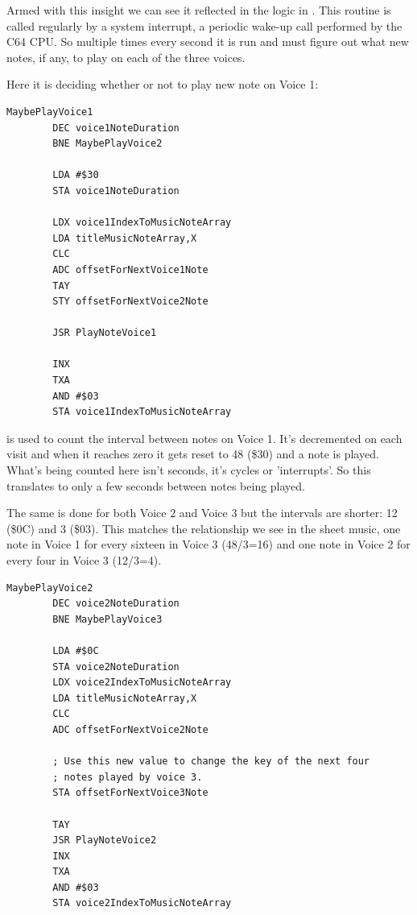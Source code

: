 Armed with this insight we can see it reflected in the logic in . This routine
is called regularly by a system interrupt, a periodic wake-up call performed by the C64 CPU. So multiple
times every second it is run and must figure out what new notes, if any, to play on each of the three
voices.

Here it is deciding whether or not to play new note on Voice 1:

\begin{lstlisting}[caption=\icode{MaybePlayVoice1}\, part of \icode{PlayTitleScreenMusic}.,basicstyle=\tiny]
MaybePlayVoice1   
        DEC voice1NoteDuration
        BNE MaybePlayVoice2

        LDA #$30
        STA voice1NoteDuration

        LDX voice1IndexToMusicNoteArray
        LDA titleMusicNoteArray,X
        CLC
        ADC offsetForNextVoice1Note
        TAY
        STY offsetForNextVoice2Note

        JSR PlayNoteVoice1

        INX
        TXA
        AND #$03
        STA voice1IndexToMusicNoteArray
\end{lstlisting}
 is used to count the interval between notes on Voice 1. It's decremented on each
visit and when it reaches zero it gets reset to 48 (\$30) and a note is played. What's being counted here isn't
seconds, it's cycles or 'interrupts'. So this translates to only a few seconds between notes being played.

The same is done for both Voice 2 and Voice 3 but the intervals are shorter: 12 (\$0C) and 3 (\$03). This matches
the relationship we see in the sheet music, one note in Voice 1 for every sixteen in Voice 3 (48/3=16) and one note in
Voice 2 for every four in Voice 3 (12/3=4).

\begin{lstlisting}[caption=\icode{MaybePlayVoice2}\, part of \icode{PlayTitleScreenMusic}.]
MaybePlayVoice2   
        DEC voice2NoteDuration
        BNE MaybePlayVoice3

        LDA #$0C
        STA voice2NoteDuration
        LDX voice2IndexToMusicNoteArray
        LDA titleMusicNoteArray,X
        CLC
        ADC offsetForNextVoice2Note

        ; Use this new value to change the key of the next four
        ; notes played by voice 3. 
        STA offsetForNextVoice3Note

        TAY
        JSR PlayNoteVoice2
        INX
        TXA
        AND #$03
        STA voice2IndexToMusicNoteArray
\end{lstlisting}

